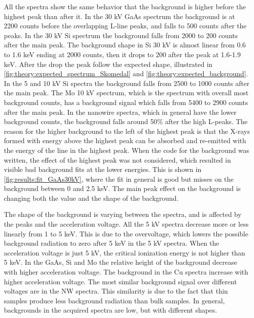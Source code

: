 All the spectra show the same behavior that the background is higher before the highest peak than after it.
In the 30 kV GaAs spectrum the background is at 2200 counts before the overlapping L-line peaks, and falls to 500 counts after the peaks.
In the 30 kV Si spectrum the background falls from 2000 to 200 counts after the main peak.
The background shape in Si 30 kV is almost linear from 0.6 to 1.6 keV ending at 2000 counts, then it drops to 200 after the peak at 1.6-1.9 keV.
After the drop the peak follow the expected shape, illustrated in \cref{fig:theory:expected_spectrum_Skomedal} and \cref{fig:theory:expected_background}.
In the 5 and 10 kV Si spectra the background falls from 2500 to 1000 counts after the main peak.
The Mo 10 kV spectrum, which is the spectrum with overall most background counts, has a background signal which falls from 5400 to 2900 counts after the main peak.
In the nanowire spectra, which in general have the lower background counts, the background falls around 50\% after the high L-peaks.
The reason for the higher background to the left of the highest peak is that the X-rays formed with energy above the highest peak can be absorbed and re-emitted with the energy of the line in the highest peak.
When the code for the background was written, the effect of the highest peak was not considered, which resulted in visible bad background fits at the lower energies.
This is shown in \cref{fig:results:fit_GaAs30kV}, where the fit in general is good but misses on the background between 0 and 2.5 keV.
The main peak effect on the background is changing both the value and the shape of the background.


The shape of the background is varying between the spectra, and is affected by the peaks and the acceleration voltage.
All the 5 kV spectra decrease more or less linearly from 1 to 5 keV.
This is due to the overvoltage, which lowers the possible background radiation to zero after 5 keV in the 5 kV spectra.
When the acceleration voltage is just 5 kV, the critical ionization energy is not higher than 5 keV.
In the GaAs, Si and Mo the relative height of the background decrease with higher acceleration voltage.
The background in the Cu spectra increase with higher acceleration voltage.
The most similar background signal over different voltages are in the NW spectra. %
This similarity is due to the fact that thin samples produce less background radiation than bulk samples.
In general, backgrounds in the acquired spectra are low, but with different shapes.



